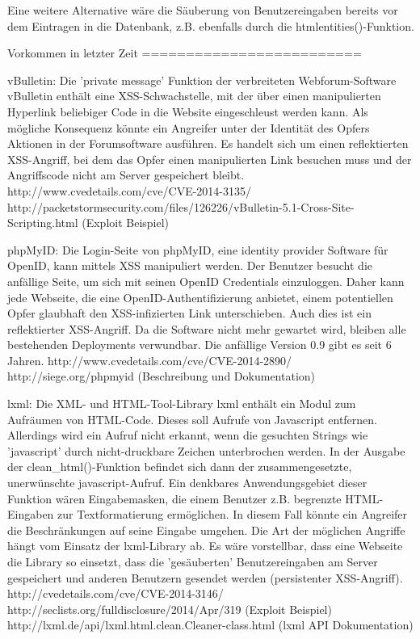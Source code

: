 \documentclass[12pt,a4paper,titlepage,oneside]{scrartcl}
\begin{document}
Eine weitere Alternative wäre die Säuberung von Benutzereingaben bereits vor dem Eintragen in die Datenbank, z.B. ebenfalls durch die htmlentities()-Funktion.

Vorkommen in letzter Zeit
=========================

vBulletin:
Die 'private message' Funktion der verbreiteten Webforum-Software vBulletin enthält eine XSS-Schwachstelle, mit der über einen manipulierten Hyperlink beliebiger Code in die Website eingeschleust werden kann.
Als mögliche Konsequenz könnte ein Angreifer unter der Identität des Opfers Aktionen in der Forumsoftware ausführen.
Es handelt sich um einen reflektierten XSS-Angriff, bei dem das Opfer einen manipulierten Link besuchen muss und der Angriffscode nicht am Server gespeichert bleibt.
http://www.cvedetails.com/cve/CVE-2014-3135/
http://packetstormsecurity.com/files/126226/vBulletin-5.1-Cross-Site-Scripting.html (Exploit Beispiel)

phpMyID:
Die Login-Seite von phpMyID, eine identity provider Software für OpenID, kann mittels XSS manipuliert werden. Der Benutzer besucht die anfällige Seite, um sich mit seinen OpenID Credentials einzuloggen. Daher kann jede Webseite, die eine OpenID-Authentifizierung anbietet, einem potentiellen Opfer glaubhaft den XSS-infizierten Link unterschieben. Auch dies ist ein reflektierter XSS-Angriff. Da die Software nicht mehr gewartet wird, bleiben alle bestehenden Deployments verwundbar. Die anfällige Version 0.9 gibt es seit 6 Jahren.
http://www.cvedetails.com/cve/CVE-2014-2890/
http://siege.org/phpmyid (Beschreibung und Dokumentation)

lxml:
Die XML- und HTML-Tool-Library lxml enthält ein Modul zum Aufräumen von HTML-Code. Dieses soll Aufrufe von Javascript entfernen. Allerdings wird ein Aufruf nicht erkannt, wenn die gesuchten Strings wie 'javascript' durch nicht-druckbare Zeichen unterbrochen werden. In der Ausgabe der clean_html()-Funktion befindet sich dann der zusammengesetzte, unerwünschte javascript-Aufruf.
Ein denkbares Anwendungsgebiet dieser Funktion wären Eingabemasken, die einem Benutzer z.B. begrenzte HTML-Eingaben zur Textformatierung ermöglichen. In diesem Fall könnte ein Angreifer die Beschränkungen auf seine Eingabe umgehen.
Die Art der möglichen Angriffe hängt vom Einsatz der lxml-Library ab. Es wäre vorstellbar, dass eine Webseite die Library so einsetzt, dass die 'gesäuberten' Benutzereingaben am Server gespeichert und anderen Benutzern gesendet werden (persistenter XSS-Angriff).
http://cvedetails.com/cve/CVE-2014-3146/
http://seclists.org/fulldisclosure/2014/Apr/319 (Exploit Beispiel)
http://lxml.de/api/lxml.html.clean.Cleaner-class.html (lxml API Dokumentation)
\end{document}
